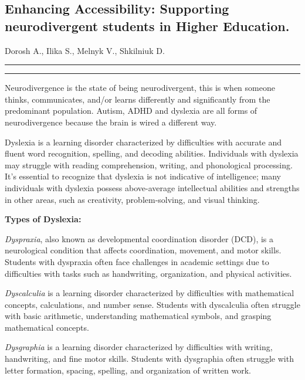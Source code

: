 \documentclass[a4paper,12pt]{article}
\begin{document}

\begin{large}


\begin{center}
\section*{Enhancing Accessibility: Supporting neurodivergent students in Higher Education.}

Dorosh A., Ilika S., Melnyk V., Shkilniuk D.

\end{center}

\bigskip


\hrule height 1pt
\vskip 3pt \hrule
\medskip
\medskip

\medskip

Neurodivergence is the state of being neurodivergent, this is when someone thinks, communicates, and/or learns differently and significantly from the predominant population. Autism, ADHD and dyslexia are all forms of neurodivergence because the brain is wired a different way.

Dyslexia is a learning disorder characterized by difficulties with accurate and fluent word recognition, spelling, and decoding abilities. Individuals with dyslexia may struggle with reading comprehension, writing, and phonological processing. It's essential to recognize that dyslexia is not indicative of intelligence; many individuals with dyslexia possess above-average intellectual abilities and strengths in other areas, such as creativity, problem-solving, and visual thinking.

\textbf{Types of Dyslexia:}

\textit{Dyspraxia}, also known as developmental coordination disorder (DCD), is a neurological condition that affects coordination, movement, and motor skills. Students with dyspraxia often face challenges in academic settings due to difficulties with tasks such as handwriting, organization, and physical activities.

\textit{Dyscalculia} is a learning disorder characterized by difficulties with mathematical concepts, calculations, and number sense. Students with dyscalculia often struggle with basic arithmetic, understanding mathematical symbols, and grasping mathematical concepts.

\textit{Dysgraphia} is a learning disorder characterized by difficulties with writing, handwriting, and fine motor skills. Students with dysgraphia often struggle with letter formation, spacing, spelling, and organization of written work.



\end{large}
\end{document}
